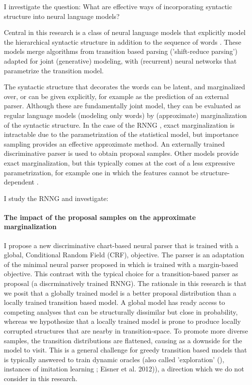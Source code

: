 % 

I investigate the question: What are effective ways of incorporating syntactic structure into neural language models?

Central in this research is a class of neural language models that explicitly model the hierarchical syntactic structure in addition to the sequence of words \cite{Dyer+2016:RNNG, Buys+2015:neural-gen-dep, Buys+2018}. These models merge algorithms from transition based parsing ('shift-reduce parsing') adapted for joint (generative) modeling, with (recurrent) neural networks that parametrize the transition model.

The syntactic structure that decorates the words can be latent, and marginalized over, or can be given explicitly, for example as the prediction of an external parser. Although these are fundamentally joint model, they can be evaluated as regular language models (modeling only words) by (approximate) marginalization of the syntactic structure. In the case of the RNNG \citep{Dyer+2016:RNNG}, exact marginalization is intractable due to the parametrization of the statistical model, but importance sampling provides an effective approximate method. An externally trained discriminative parser is used to obtain proposal samples. Other models provide exact marginalization, but this typically comes at the cost of a less expressive parametrization, for example one in which the features cannot be structure-dependent \citep{Buys+2018}.

I study the RNNG and investigate:

\paragraph{The impact of the proposal samples on the approximate marginalization}
I propose a new discriminative chart-based neural parser that is trained with a global, Conditional Random Field (CRF), objective. The parser is an adaptation of the minimal neural parser proposed in \citep{Stern+2017:Minimal} which is trained with a margin-based objective. This contrast with the typical choice for a transition-based parser as proposal (a discrminatively trained RNNG). The rationale in this research is that we posit that a globally trained model is a better proposal distribution than a locally trained transition based model. A global model has ready access to competing analyses that can be structurally dissimilar but close in probability, whereas we hypothesize that a locally trained model is prone to produce locally corrupted structures that are nearby in transition-space. To promote more diverse samples, the transition distributions are flattened, causing as a downside for the model to visit. This is a general challenge for greedy transition based models that is typically answered to train dynamic oracles \citep{Goldberg+2013:dynamic} (also called 'exploration' (\citep{Ballesteros+2016:exploration,Stern+2017:Minimal}), instances of imitation learning \citep{Vlachos}; Eisner et al. 2012)), a direction which we do not consider in this research.



